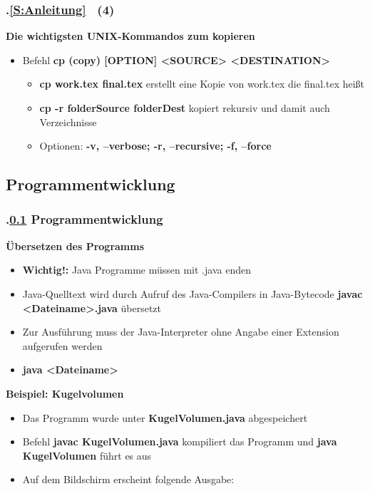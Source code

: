 \begin{frame}[t]%
\frametitle{\kap.\ref{S:Anleitung} \stitle\ (4)}%
\medskip

\textbf{Die wichtigsten UNIX-Kommandos zum kopieren}
\begin{itemize}
  \setlength{\itemsep}{4pt}
  \item Befehl \textbf{cp (copy) [OPTION] <SOURCE> <DESTINATION>}
  \begin{itemize}
    \setlength{\itemsep}{2pt}
    \item \textbf{cp work.tex final.tex} erstellt eine Kopie von work.tex die final.tex hei\ss t
    \item \textbf{cp -r folderSource folderDest} kopiert rekursiv und damit auch Verzeichnisse
    \item Optionen: \textbf{-v, --verbose; -r, --recursive; -f, --force}
  \end{itemize}
\end{itemize}
\end{frame}


\def\stitle{Programmentwicklung}%
\subsection{\stitle}\label{S:Progentw}
\begin{frame}[t]%
\frametitle{\kap.\ref{S:Progentw} \stitle}%
\medskip

\textbf{\"Ubersetzen des Programms}
\begin{itemize}
  \item \textbf{Wichtig!:} Java Programme m\"ussen mit .java enden
  \item Java-Quelltext wird durch Aufruf des Java-Compilers in Java-Bytecode \textbf{javac <Dateiname>.java} \"ubersetzt
  \item Zur Ausf\"uhrung muss der Java-Interpreter ohne Angabe einer Extension aufgerufen werden
  \item[] \textbf{java <Dateiname>}
\end{itemize}
\medskip

\textbf{Beispiel: Kugelvolumen}
\begin{itemize}
  \item Das Programm wurde unter \textbf{KugelVolumen.java} abgespeichert
  \item Befehl \textbf{javac KugelVolumen.java} kompiliert das Programm und \textbf{java KugelVolumen} f\"uhrt es aus
  \item Auf dem Bildschirm erscheint folgende Ausgabe: \\
\end{itemize}
\end{frame}
